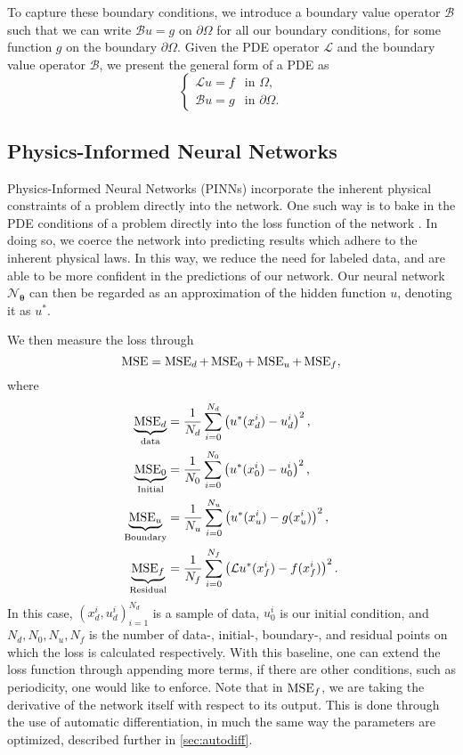 To capture these boundary conditions, we introduce a boundary value operator $\mathcal B$ such that we can write $\mathcal B u = g$ on $\partial \Omega$ for all our boundary conditions, for some function $g$ on the boundary $\partial\Omega$.
Given the PDE operator $\mathcal L$ and the boundary value operator $\mathcal B$, we present the general form of a PDE as
\begin{equation}
\begin{cases}
    \mathcal{L}u = f &\text{in } \Omega,\\
    \mathcal{B}u = g &\text{in } \partial\Omega.
\end{cases}
\label{eq:PDE}
\end{equation}

\subsection{Physics-Informed Neural Networks}
Physics-Informed Neural Networks (PINNs) incorporate the inherent physical constraints of a problem directly into the network.
One such way is to bake in the PDE conditions of a problem directly into the loss function of the network \cite{RAISSI2019686}.
In doing so, we coerce the network into predicting results which adhere to the inherent physical laws.
In this way, we reduce the need for labeled data, and are able to be more confident in the predictions of our network.
Our neural network $\mathcal{N}_{\boldsymbol{\theta}}$ can then be regarded as an approximation of the hidden function $u$, denoting it as $u^*$.

We then measure the loss through
\begin{equation}\label{eq:PINNMSE}
    \operatorname{MSE} = \operatorname{MSE}_d + \operatorname{MSE}_0 + \operatorname{MSE}_u + \operatorname{MSE}_f,
\end{equation}
where
\begin{equation*}
\begin{split}
    \underbrace{\operatorname{MSE}_d}_{\text{data}} &= \frac{1}{N_d} \sum_{i = 0}^{N_d} \left( u^*(x_d^i) - u_d^i \right)^2,  \\
    \underbrace{\operatorname{MSE}_0}_{\text{Initial}} &= \frac{1}{N_0} \sum_{i = 0}^{N_0} \left( u^*(x_0^i) - u_0^i \right)^2,  \\
    \underbrace{\operatorname{MSE}_u}_{\text{Boundary}} &= \frac{1}{N_u} \sum_{i = 0}^{N_u} \left( u^*(x_u^i) - g(x_u^i) \right)^2, \\
    \underbrace{\operatorname{MSE}_f}_{\text{Residual}} &= \frac{1}{N_f} \sum_{i = 0}^{N_f} \left( \mathcal{L}u^*(x_f^i) - f(x_f^i) \right)^2.
\end{split}
\end{equation*}
In this case, $(x_d^i,u_d^i)_{i=1}^{N_d}$ is a sample of data, $u_0^i$ is our initial condition, and $N_d,N_0,N_u,N_f$ is the number of data-, initial-, boundary-, and residual points on which the loss is calculated respectively. 
With this baseline, one can extend the loss function through appending more terms, if there are other conditions, such as periodicity, one would like to enforce.
Note that in $\operatorname{MSE}_f$, we are taking the derivative of the network itself with respect to its output.
This is done through the use of automatic differentiation, in much the same way the parameters are optimized, described further in \autoref{sec:autodiff}.


